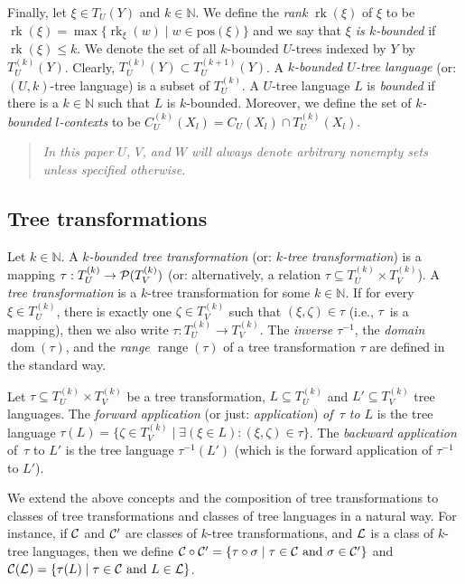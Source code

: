 \documentclass[10pt]{scrartcl}
\newcommand{\nat}{\mathbb{N}}
\newcommand{\pos}{\mathrm{pos}}
\DeclareMathOperator{\rk}{rk}
\DeclareMathOperator{\dom}{dom}
\DeclareMathOperator{\range}{range}
\def\ui#1{^{(#1)}}
\begin{document}
Finally, let $\xi \in T_U(Y)$ and $k \in \nat$. 
We define the \emph{rank} $\rk(\xi)$ of $\xi$ to be $\rk(\xi) = \max\{\rk_\xi(w) \mid w \in \pos(\xi)\}$ and  we say that {\em $\xi$ is $k$-bounded} if $\rk(\xi) \le k$. We denote 
the set of all $k$-bounded $U$-trees indexed by $Y$ by $T_U^{(k)}(Y)$. Clearly, $T_U^{(k)}(Y)\subset T_U^{(k+1)}(Y)$.
A \emph{$k$-bounded $U$-tree language} (or: $(U,k)$-tree language) is a subset of $T_U^{(k)}$. 
A $U$-tree language $L$ is \emph{bounded} if there is a $k \in \nat$ such that $L$ is $k$-bounded. 
Moreover, we define the set of {\em $k$-bounded $l$-contexts} to be $C_U\ui k(X_l)=C_U(X_l)\cap T_U^{(k)}(X_l)$.



\begin{quote}\it In this paper $U$, $V$, and $W$ will always denote arbitrary nonempty sets unless specified otherwise.
\end{quote} 



\subsection{Tree transformations}\label{sect:tree-trans}


Let $k \in \nat$. A \emph{$k$-bounded tree transformation} (or: \emph{$k$-tree transformation}) is a mapping $\tau : T_U^{(k)} \to {\cal P}(T_{V}^{(k)})$ (or: alternatively, a relation $\tau \subseteq T_U^{(k)}
\times T_{V}^{(k)}$). A \emph{tree transformation} is a $k$-tree transformation for some $k \in \nat$.  If for every $\xi \in T_U^{(k)}$, there is exactly one $\zeta \in T_{V}^{(k)}$ such that $(\xi,\zeta) \in \tau$ (i.e., $\tau$~is a
mapping), then we also write $\tau \colon T_U^{(k)} \to T_{V}^{(k)}$. The {\em inverse $\tau^{-1}$}, the {\em domain $\dom(\tau)$},
and the {\em range $\range(\tau)$} of a tree transformation $\tau$ are defined in the standard way.



Let $\tau  \subseteq T_U^{(k)} \times T_{V}^{(k)}$ be a tree transformation, $L \subseteq T_U^{(k)}$ and $L' \subseteq T_{V}^{(k)}$ tree languages.
The \emph{forward   application} (or just: {\em application}) \emph{of~$\tau$ to $L$} is the tree language $\tau(L)= \{
\zeta \in T_{V}^{(k)}\mid \exists (\xi \in L) : (\xi,\zeta)\in
\tau\}$. The \emph{backward application} of~$\tau$ to $L'$ is the tree
language $\tau^{-1}(L')$ (which is
the forward application of $\tau^{-1}$ to $L'$).

We extend the above concepts and the composition of tree transformations to classes of tree transformations and classes of tree languages in a natural way. For instance, if $\cal C$ and $\cal C'$ are classes of $k$-tree transformations, and $\cal L$ is a class of $k$-tree languages, then we define ${\cal C}\circ {\cal C'} = \{\tau\circ  \sigma \mid \tau \in {\cal C} \text{ and }  \sigma \in {\cal C'}\}$ and ${\cal C}({\cal L})= \{ \tau(L) \mid \tau \in {\cal C} \text{ and }  L \in {\cal L}\}$.
\end{document}
